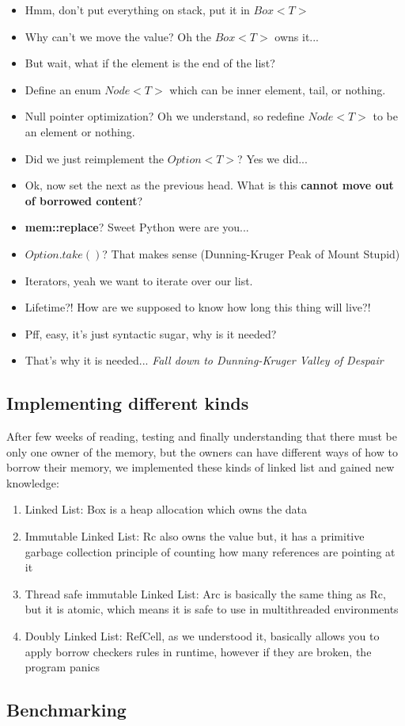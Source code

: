\documentclass[11pt,twoside,a4paper]{article}
\begin{document}
\begin{itemize}
    \item Hmm, don't put everything on stack, put it in $Box<T>$
    \item Why can't we move the value? Oh the $Box<T>$ owns it...
    \item But wait, what if the element is the end of the list?
    \item Define an enum $Node<T>$ which can be inner element, tail, or nothing.
    \item Null pointer optimization? Oh we understand, so redefine $Node<T>$ to
          be an element or nothing.
    \item Did we just reimplement the $Option<T>$? Yes we did...
    \item Ok, now set the next as the previous head. What is this
          \textbf{cannot move out of borrowed content}?
    \item \textbf{mem::replace}? Sweet Python were are you...
    \item $Option.take()$? That makes sense (Dunning-Kruger Peak of Mount Stupid)
    \item Iterators, yeah we want to iterate over our list.
    \item Lifetime?! How are we supposed to know how long this thing will live?!
    \item Pff, easy, it's just syntactic sugar, why is it needed?
    \item That's why it is needed... \emph{Fall down to Dunning-Kruger Valley of Despair}
\end{itemize}

\subsection*{Implementing different kinds}

After few weeks of reading, testing and finally understanding that there must
be only one owner of the memory, but the owners can have different ways of
how to borrow their memory, we implemented these kinds of linked list and gained
new knowledge:

\begin{enumerate}
    \item Linked List: Box is a heap allocation which owns the data
    \item Immutable Linked List: Rc also owns the value but, it has a primitive
          garbage collection principle of counting how many references are pointing
          at it
    \item Thread safe immutable Linked List: Arc is basically the same thing as
          Rc, but it is atomic, which means it is safe to use in multithreaded environments
    \item Doubly Linked List: RefCell, as we understood it, basically allows you
          to apply borrow checkers rules in runtime, however if they are broken,
          the program panics
\end{enumerate}

\subsection*{Benchmarking}



\end{document}
